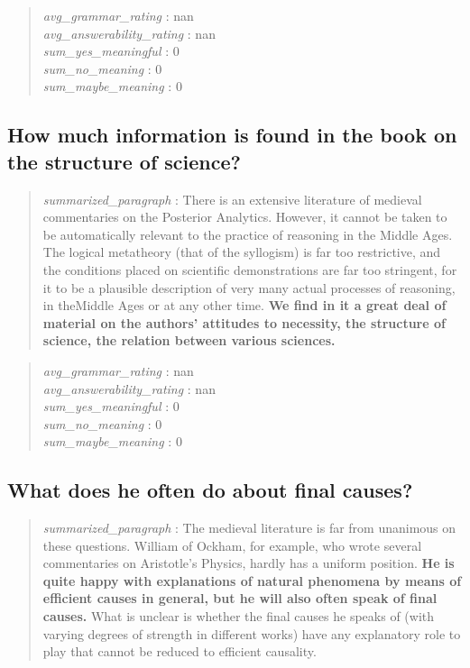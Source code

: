 \begin{quote}
\emph{avg\_grammar\_rating} : nan\\
\emph{avg\_answerability\_rating} : nan\\
\emph{sum\_yes\_meaningful} : 0\\
\emph{sum\_no\_meaning} : 0\\
\emph{sum\_maybe\_meaning} : 0
\end{quote}

\hypertarget{how-much-information-is-found-in-the-book-on-the-structure-of-science}{%
\subsection{How much information is found in the book on the structure
of
science?}\label{how-much-information-is-found-in-the-book-on-the-structure-of-science}}

\begin{quote}
\emph{summarized\_paragraph} : There is an extensive literature of
medieval commentaries on the Posterior Analytics. However, it cannot be
taken to be automatically relevant to the practice of reasoning in the
Middle Ages. The logical metatheory (that of the syllogism) is far too
restrictive, and the conditions placed on scientific demonstrations are
far too stringent, for it to be a plausible description of very many
actual processes of reasoning, in theMiddle Ages or at any other time.
\textbf{We find in it a great deal of material on the authors' attitudes
to necessity, the structure of science, the relation between various
sciences.}
\end{quote}

\begin{quote}
\emph{avg\_grammar\_rating} : nan\\
\emph{avg\_answerability\_rating} : nan\\
\emph{sum\_yes\_meaningful} : 0\\
\emph{sum\_no\_meaning} : 0\\
\emph{sum\_maybe\_meaning} : 0
\end{quote}

\hypertarget{what-does-he-often-do-about-final-causes}{%
\subsection{What does he often do about final
causes?}\label{what-does-he-often-do-about-final-causes}}

\begin{quote}
\emph{summarized\_paragraph} : The medieval literature is far from
unanimous on these questions. William of Ockham, for example, who wrote
several commentaries on Aristotle's Physics, hardly has a uniform
position. \textbf{He is quite happy with explanations of natural
phenomena by means of efficient causes in general, but he will also
often speak of final causes.} What is unclear is whether the final
causes he speaks of (with varying degrees of strength in different
works) have any explanatory role to play that cannot be reduced to
efficient causality.
\end{quote}

